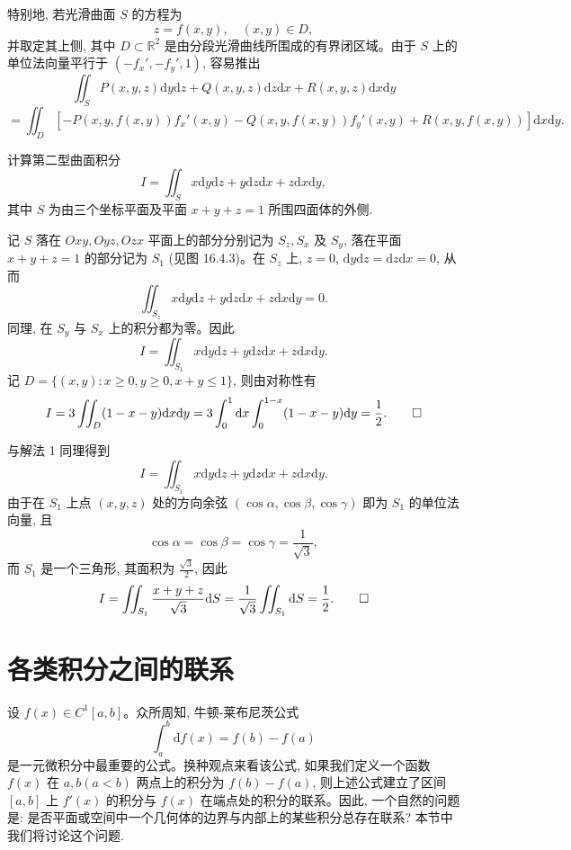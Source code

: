 特别地, 若光滑曲面 $S$ 的方程为
\[
  z=f(x,y),\quad (x,y)\in D,
\]
并取定其上侧, 其中 $D\subset\mathbb R^2$ 是由分段光滑曲线所围成的有界闭区域。由于 $S$ 上的单位法向量平行于 $(-f_x',-f_y',1)$, 容易推出
\[
  \iint_S P(x,y,z)\mathrm dy\mathrm dz+Q(x,y,z)\mathrm dz\mathrm dx+R(x,y,z)\mathrm dx\mathrm dy
\]
\[
  =\iint_D[-P(x,y,f(x,y))f_x'(x,y)-Q(x,y,f(x,y))f_y'(x,y)
  +R(x,y,f(x,y))]\mathrm dx\mathrm dy.
\]

\begin{example}\label{example:ma-16-4-2}
计算第二型曲面积分
\[
  I=\iint_S x\mathrm dy\mathrm dz+y\mathrm dz\mathrm dx+z\mathrm dx\mathrm dy,
\]
其中 $S$ 为由三个坐标平面及平面 $x+y+z=1$ 所围四面体的外侧.
\end{example}


\begin{solve}[{解法 1}]
记 $S$ 落在 $Oxy,Oyz,Ozx$ 平面上的部分分别记为 $S_z,S_x$ 及 $S_y$, 落在平面 $x+y+z=1$ 的部分记为 $S_1$ (见图 16.4.3)。在 $S_z$ 上, $z=0$, $\mathrm dy\mathrm dz=\mathrm dz\mathrm dx=0$, 从而
\[
  \iint_{S_z}x\mathrm dy\mathrm dz+y\mathrm dz\mathrm dx+z\mathrm dx\mathrm dy=0.
\]
同理, 在 $S_y$ 与 $S_x$ 上的积分都为零。因此
\[
  I=\iint_{S_1}x\mathrm dy\mathrm dz+y\mathrm dz\mathrm dx+z\mathrm dx\mathrm dy.
\]
记 $D=\{(x,y):x\geqslant0,y\geqslant0,x+y\leqslant1\}$, 则由对称性有
\[
  I=3\iint_D(1-x-y)\mathrm dx\mathrm dy
  =3\int_0^1\mathrm dx\int_0^{1-x}(1-x-y)\mathrm dy=\frac12.
\qedhere
\]
\end{solve}


\begin{solve}[{解法 2}]
与解法 1 同理得到
\[
  I=\iint_{S_1}x\mathrm dy\mathrm dz+y\mathrm dz\mathrm dx+z\mathrm dx\mathrm dy.
\]
由于在 $S_1$ 上点 $(x,y,z)$ 处的方向余弦 $(\cos\alpha,\cos\beta,\cos\gamma)$ 即为 $S_1$ 的单位法向量, 且
\[
  \cos\alpha=\cos\beta=\cos\gamma=\frac1{\sqrt3},
\]
而 $S_1$ 是一个三角形, 其面积为 $\frac{\sqrt3}{2}$, 因此
\[
  I=\iint_{S_1}\frac{x+y+z}{\sqrt3}\mathrm dS
  =\frac1{\sqrt3}\iint_{S_1}\mathrm dS=\frac12.
\qedhere
\]
\end{solve}


\section{各类积分之间的联系}
\label{sec:ma-16-5}

设 $f(x)\in C^1[a,b]$。众所周知, 牛顿-莱布尼茨公式
\[
  \int_a^b\mathrm df(x)=f(b)-f(a)
\]
是一元微积分中最重要的公式。换种观点来看该公式, 如果我们定义一个函数 $f(x)$ 在 $a,b(a<b)$ 两点上的积分为 $f(b)-f(a)$, 则上述公式建立了区间 $[a,b]$ 上 $f'(x)$ 的积分与 $f(x)$ 在端点处的积分的联系。因此, 一个自然的问题是: 是否平面或空间中一个几何体的边界与内部上的某些积分总存在联系? 本节中我们将讨论这个问题.

